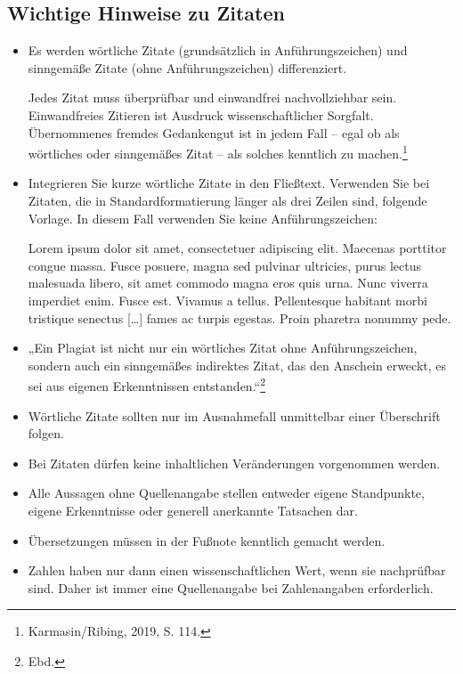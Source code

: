 \subsection{Wichtige Hinweise zu Zitaten}
\begin{itemize}
	\item	Es werden wörtliche Zitate (grundsätzlich in Anführungszeichen) und sinngemäße Zitate (ohne Anführungszeichen) differenziert.
	\begin{addmargin}[10pt]{0pt}
		{\footnotesize Jedes Zitat muss überprüfbar und einwandfrei nachvollziehbar sein. Einwandfreies Zitieren ist Ausdruck wissenschaftlicher Sorgfalt. Übernommenes fremdes Gedankengut ist in jedem Fall – egal ob als wörtliches oder sinngemäßes Zitat – als solches kenntlich zu machen.\footnote{Karmasin/Ribing, 2019, S. 114.}}
	\end{addmargin}
	
	\item	Integrieren Sie kurze wörtliche Zitate in den Fließtext. Verwenden Sie bei Zitaten, die in Standardformatierung länger als drei Zeilen sind, folgende Vorlage. In diesem Fall verwenden Sie keine Anführungszeichen:
	\begin{addmargin}[10pt]{0pt}
		{\footnotesize Lorem ipsum dolor sit amet, consectetuer adipiscing elit. Maecenas porttitor congue massa. Fusce posuere, magna sed pulvinar ultricies, purus lectus malesuada libero, sit amet commodo magna eros quis urna. Nunc viverra imperdiet enim. Fusce est. Vivamus a tellus. Pellentesque habitant morbi tristique senectus [\dots] fames ac turpis egestas. Proin pharetra nonummy pede. \cite[S. 6]{Meier:Globalisierung}}
	\end{addmargin}
	
	\item	„Ein Plagiat ist nicht nur ein wörtliches Zitat ohne Anführungszeichen, sondern auch ein sinngemäßes indirektes Zitat, das den Anschein erweckt, es sei aus eigenen Erkenntnissen entstanden.“\footnote{Ebd.}
	
	\item	Wörtliche Zitate sollten nur im Ausnahmefall unmittelbar einer Überschrift folgen.
	
	\item	Bei Zitaten dürfen keine inhaltlichen Veränderungen vorgenommen werden.
	
	\item	Alle Aussagen ohne Quellenangabe stellen entweder eigene Standpunkte, eigene Erkenntnisse oder generell anerkannte Tatsachen dar.
	
	\item	Übersetzungen müssen in der Fußnote kenntlich gemacht werden.
	
	\item	Zahlen haben nur dann einen wissenschaftlichen Wert, wenn sie nachprüfbar sind. Daher ist immer eine Quellenangabe bei Zahlenangaben erforderlich.
	
\end{itemize}

